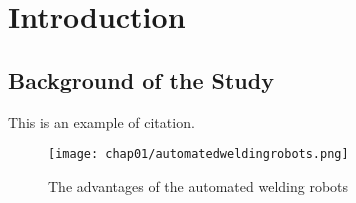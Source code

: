 
\chapter{Introduction}
\label{chap01:introduction}

\section{Background of the Study}
\label{chap01:sec:background}
This is an example of citation\cite{GregoryPhd}.
\begin{figure}[!hbt]
\centering
    \texttt{[image: chap01/automatedweldingrobots.png]}
\caption{The advantages of the automated welding robots}
\label{chap01:fig:advantages}
\end{figure}

